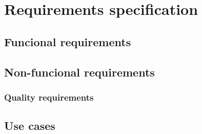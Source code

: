 
\chapter{Requirements specification} %

\label{Requirements} %


\section{Funcional requirements}

\section{Non-funcional requirements}

\subsection{Quality requirements}


\section{Use cases}

